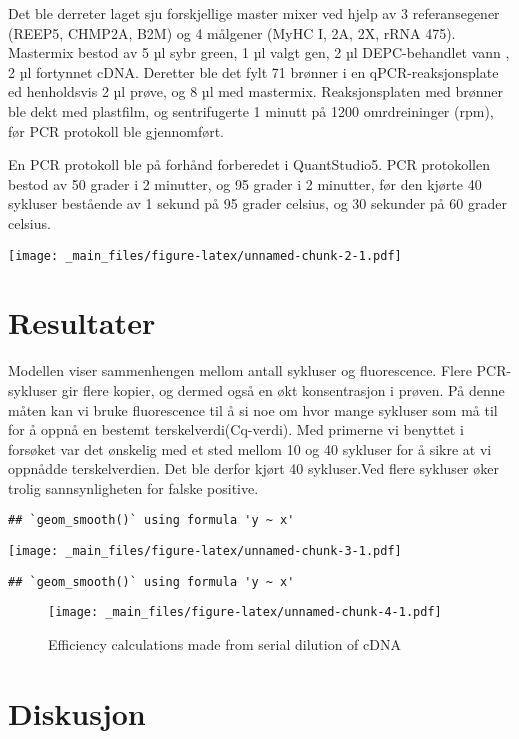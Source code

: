 \documentclass[
]{book}
\begin{document}
Det ble derreter laget sju forskjellige master mixer ved hjelp av 3 referansegener (REEP5, CHMP2A, B2M) og 4 målgener (MyHC I, 2A, 2X, rRNA 475). Mastermix bestod av 5 µl sybr green, 1 µl valgt gen, 2 µl DEPC-behandlet vann , 2 µl fortynnet cDNA. Deretter ble det fylt 71 brønner i en qPCR-reaksjonsplate ed henholdsvis 2 µl prøve, og 8 µl med mastermix. Reaksjonsplaten med brønner ble dekt med plastfilm, og sentrifugerte 1 minutt på 1200 omrdreininger (rpm), før PCR protokoll ble gjennomført.

En PCR protokoll ble på forhånd forberedet i QuantStudio5. PCR protokollen bestod av 50 grader i 2 minutter, og 95 grader i 2 minutter, før den kjørte 40 sykluser bestående av 1 sekund på 95 grader celsius, og 30 sekunder på 60 grader celsius.

\texttt{[image: \_main\_files/figure-latex/unnamed-chunk-2-1.pdf]}

\hypertarget{resultater-1}{%
\section{Resultater}\label{resultater-1}}

Modellen viser sammenhengen mellom antall sykluser og fluorescence. Flere PCR-sykluser gir flere kopier, og dermed også en økt konsentrasjon i prøven. På denne måten kan vi bruke fluorescence til å si noe om hvor mange sykluser som må til for å oppnå en bestemt terskelverdi(Cq-verdi). Med primerne vi benyttet i forsøket var det ønskelig med et sted mellom 10 og 40 sykluser for å sikre at vi oppnådde terskelverdien. Det ble derfor kjørt 40 sykluser.Ved flere sykluser øker trolig sannsynligheten for falske positive.

\begin{verbatim}
## `geom_smooth()` using formula 'y ~ x'
\end{verbatim}

\texttt{[image: \_main\_files/figure-latex/unnamed-chunk-3-1.pdf]}

\begin{verbatim}
## `geom_smooth()` using formula 'y ~ x'
\end{verbatim}

\begin{figure}
\centering
\texttt{[image: \_main\_files/figure-latex/unnamed-chunk-4-1.pdf]}
\caption{\label{fig:unnamed-chunk-4}Efficiency calculations made from serial dilution of cDNA}
\end{figure}

\hypertarget{diskusjon-1}{%
\section{Diskusjon}\label{diskusjon-1}}
\end{document}
